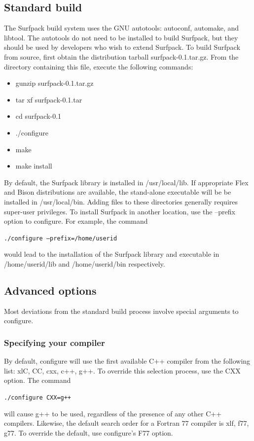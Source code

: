 \documentclass{article}
\begin{document}
\subsection{Standard build}
The Surfpack build system uses the GNU autotools: autoconf, automake, and libtool.  The autotools do not need to be installed to build Surfpack, but they should be used by developers who wish to extend Surfpack.  To build Surfpack from source, first obtain the distribution tarball surfpack-0.1.tar.gz.  From the directory containing this file, execute the following commands:
\begin{itemize}
\item gunzip surfpack-0.1.tar.gz
\item tar xf surfpack-0.1.tar
\item cd surfpack-0.1
\item ./configure
\item make
\item make install
\end{itemize}
By default, the Surfpack library is installed in /usr/local/lib.  If appropriate Flex and Bison distributions are available, the stand-alone executable will be be installed in /usr/local/bin.  Adding files to these directories generally requires super-user privileges.  To install Surfpack in another location, use the --prefix option to configure.  For example, the command

\texttt{./configure --prefix=/home/userid}

would lead to the installation of the Surfpack library and executable in /home/userid/lib and /home/userid/bin respectively.
\subsection{Advanced options}
Most deviations from the standard build process involve special arguments to configure.
\subsubsection{Specifying your compiler}
By default, configure will use the first available C++ compiler from the following list: xlC, CC, cxx, c++, g++.  To override this selection process, use the CXX option.  The command

\texttt{./configure CXX=g++}

will cause g++ to be used, regardless of the presence of any other C++ compilers.  Likewise, the default search order for a Fortran 77 compiler is xlf, f77, g77.  To override the default, use configure's F77 option.
\end{document}
